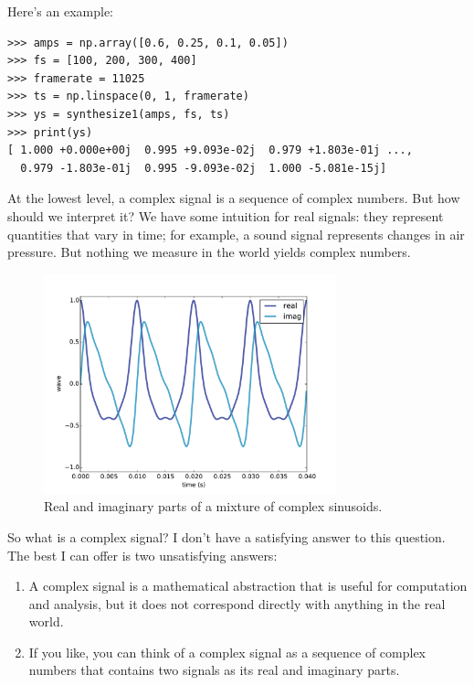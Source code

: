 \documentclass[12pt]{book}
\begin{document}
Here's an example:

\begin{verbatim}
>>> amps = np.array([0.6, 0.25, 0.1, 0.05])
>>> fs = [100, 200, 300, 400]
>>> framerate = 11025
>>> ts = np.linspace(0, 1, framerate)
>>> ys = synthesize1(amps, fs, ts)
>>> print(ys)
[ 1.000 +0.000e+00j  0.995 +9.093e-02j  0.979 +1.803e-01j ...,
  0.979 -1.803e-01j  0.995 -9.093e-02j  1.000 -5.081e-15j]
\end{verbatim}

At the lowest level, a complex signal is a sequence of complex
numbers.  But how should we interpret it?  We have some intuition for
real signals: they represent quantities that vary in time; for
example, a sound signal represents changes in air pressure.
But nothing we measure in the world yields complex numbers.

\begin{figure}
\centerline{\includegraphics[height=2.5in]{figs/dft1.pdf}}
\caption{Real and imaginary parts of a mixture of complex sinusoids.}
\label{fig.dft1}
\end{figure}

So what is a complex signal?  I don't have a satisfying answer to this
question.  The best I can offer is two unsatisfying
answers:

\begin{enumerate}

\item A complex signal is a mathematical abstraction that is useful
  for computation and analysis, but it does not correspond directly
  with anything in the real world.

\item If you like, you can think of a complex signal as a sequence of
  complex numbers that contains two signals as its real and imaginary
  parts.

\end{enumerate}
\end{document}
